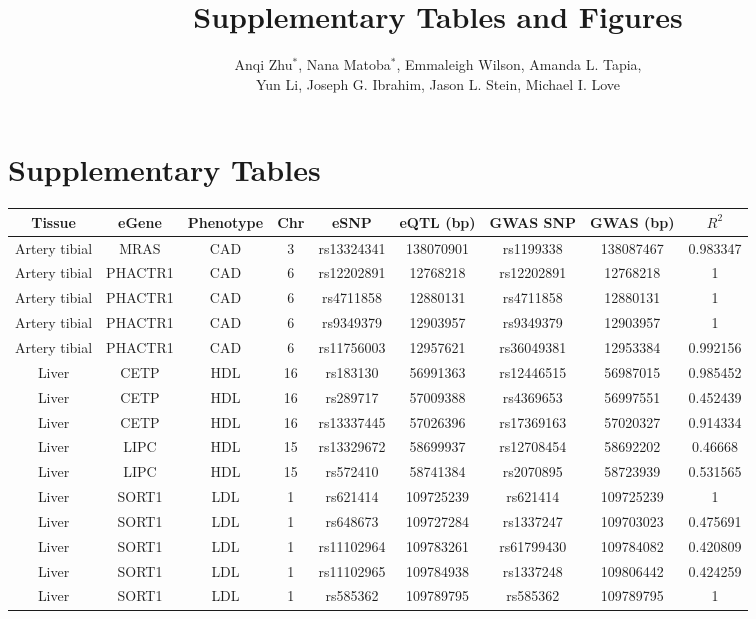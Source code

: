 \documentclass[11pt]{article}
\title{Supplementary Tables and Figures}
\author{Anqi Zhu$^*$, Nana Matoba$^*$, Emmaleigh Wilson, Amanda L. Tapia,
  \\ Yun Li, Joseph G. Ibrahim, Jason L. Stein, Michael I. Love}
\begin{document}
\maketitle

\section*{Supplementary Tables}

\begin{table}[!ht]
\centering
\footnotesize
\begin{tabular}{ccccccccc}
Tissue & eGene & Phenotype & Chr & eSNP & eQTL (bp) & GWAS SNP & GWAS (bp) & $R^2$ \\
\hline
Artery tibial  & MRAS & CAD & 3 & rs13324341 & 138070901 & rs1199338 & 138087467 & 0.983347 \\
Artery tibial  & PHACTR1 & CAD & 6 & rs12202891 & 12768218 & rs12202891 & 12768218 & 1 \\
Artery tibial  & PHACTR1 & CAD & 6 & rs4711858 & 12880131 & rs4711858 & 12880131 & 1 \\
Artery tibial  & PHACTR1 & CAD & 6 & rs9349379 & 12903957 & rs9349379 & 12903957 & 1 \\
Artery tibial  & PHACTR1 & CAD & 6 & rs11756003 & 12957621 & rs36049381 & 12953384 & 0.992156 \\
Liver & CETP & HDL & 16 & rs183130 & 56991363 & rs12446515 & 56987015 & 0.985452 \\ 
Liver & CETP & HDL & 16 & rs289717 & 57009388 & rs4369653 & 56997551 & 0.452439 \\ 
Liver & CETP & HDL & 16 & rs13337445 & 57026396 & rs17369163 & 57020327 & 0.914334 \\ 
Liver & LIPC & HDL & 15 & rs13329672 & 58699937 & rs12708454 & 58692202 & 0.46668 \\ 
Liver & LIPC & HDL & 15 & rs572410 & 58741384 & rs2070895 & 58723939 & 0.531565 \\ 
Liver & SORT1 & LDL & 1 & rs621414 & 109725239 & rs621414 & 109725239 & 1 \\ 
Liver & SORT1 & LDL & 1 & rs648673 & 109727284 & rs1337247 & 109703023 & 0.475691 \\ 
Liver & SORT1 & LDL & 1 & rs11102964 & 109783261 & rs61799430 & 109784082 & 0.420809 \\ 
Liver & SORT1 & LDL & 1 & rs11102965 & 109784938 & rs1337248 & 109806442 & 0.424259 \\ 
Liver & SORT1 & LDL & 1 & rs585362 & 109789795 & rs585362 & 109789795 & 1 \\ 

\end{tabular}
\end{table}
\end{document}
